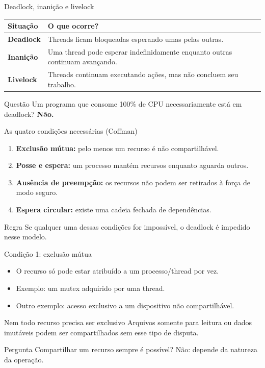 \documentclass[aspectratio=169,11pt]{beamer}
\begin{document}
\begin{frame}{Deadlock, inanição e livelock}
\small
\begin{tabular}{p{2.55cm}p{7cm}}
\toprule
\textbf{Situação} & \textbf{O que ocorre?} \\
\midrule
\textbf{Deadlock} & Threads ficam bloqueadas esperando umas pelas outras. \\[.25cm]
\textbf{Inanição} & Uma thread pode esperar indefinidamente enquanto outras continuam avançando. \\[.25cm]
\textbf{Livelock} & Threads continuam executando ações, mas não concluem seu trabalho. \\
\bottomrule
\end{tabular}
\vspace{.5cm}
\begin{alertblock}{Questão}
Um programa que consome 100\% de CPU necessariamente está em deadlock? \textbf{Não.}
\end{alertblock}
\end{frame}

\begin{frame}{As quatro condições necessárias (Coffman)}
\small
\begin{enumerate}
\setlength\itemsep{.65em}
\item \textbf{Exclusão mútua:} pelo menos um recurso é não compartilhável.
\item \textbf{Posse e espera:} um processo mantém recursos enquanto aguarda outros.
\item \textbf{Ausência de preempção:} os recursos não podem ser retirados à força de modo seguro.
\item \textbf{Espera circular:} existe uma cadeia fechada de dependências.
\end{enumerate}
\begin{block}{Regra}
Se qualquer uma dessas condições for impossível, o deadlock é impedido nesse modelo.
\end{block}
\end{frame}

\begin{frame}{Condição 1: exclusão mútua}
\small
\begin{itemize}
\setlength\itemsep{.55em}
\item O recurso só pode estar atribuído a um processo/thread por vez.
\item Exemplo: um mutex adquirido por uma thread.
\item Outro exemplo: acesso exclusivo a um dispositivo não compartilhável.
\end{itemize}
\begin{block}{Nem todo recurso precisa ser exclusivo}
Arquivos somente para leitura ou dados imutáveis podem ser compartilhados sem esse tipo de disputa.
\end{block}
\begin{alertblock}{Pergunta}
Compartilhar um recurso sempre é possível? Não: depende da natureza da operação.
\end{alertblock}
\end{frame}
\end{document}
